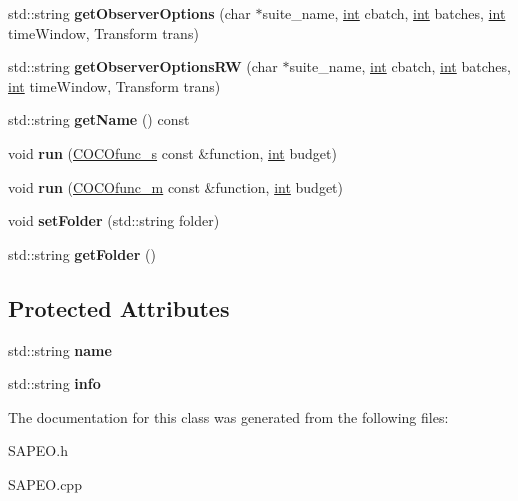 \begin{DoxyCompactItemize}
\item 
std\+::string {\bfseries get\+Observer\+Options} (char $\ast$suite\+\_\+name, \hyperlink{classint}{int} cbatch, \hyperlink{classint}{int} batches, \hyperlink{classint}{int} time\+Window, Transform trans)\hypertarget{classCocoOptimiser_ad9591d2b76f7078a956e7cdca1d8ba60}{}\label{classCocoOptimiser_ad9591d2b76f7078a956e7cdca1d8ba60}

\item 
std\+::string {\bfseries get\+Observer\+Options\+RW} (char $\ast$suite\+\_\+name, \hyperlink{classint}{int} cbatch, \hyperlink{classint}{int} batches, \hyperlink{classint}{int} time\+Window, Transform trans)\hypertarget{classCocoOptimiser_afc334f80b0aee491d2452f7f89402d17}{}\label{classCocoOptimiser_afc334f80b0aee491d2452f7f89402d17}

\item 
std\+::string {\bfseries get\+Name} () const \hypertarget{classCocoOptimiser_a265bd5d524ea5b10d5e9f4028cdc386c}{}\label{classCocoOptimiser_a265bd5d524ea5b10d5e9f4028cdc386c}

\item 
void {\bfseries run} (\hyperlink{classCOCOfunc__s}{C\+O\+C\+Ofunc\+\_\+s} const \&function, \hyperlink{classint}{int} budget)\hypertarget{classCocoOptimiser_a5842d02046cb097f0e11c84329f32799}{}\label{classCocoOptimiser_a5842d02046cb097f0e11c84329f32799}

\item 
void {\bfseries run} (\hyperlink{classCOCOfunc__m}{C\+O\+C\+Ofunc\+\_\+m} const \&function, \hyperlink{classint}{int} budget)\hypertarget{classCocoOptimiser_a1ad475649fa2f85129a8db7457cffeab}{}\label{classCocoOptimiser_a1ad475649fa2f85129a8db7457cffeab}

\item 
void {\bfseries set\+Folder} (std\+::string folder)\hypertarget{classCocoOptimiser_a2bfb5ff0b5420e95c6736070d4853eea}{}\label{classCocoOptimiser_a2bfb5ff0b5420e95c6736070d4853eea}

\item 
std\+::string {\bfseries get\+Folder} ()\hypertarget{classCocoOptimiser_aedb7b8bd6951c363b3ecbeb878cd0539}{}\label{classCocoOptimiser_aedb7b8bd6951c363b3ecbeb878cd0539}

\end{DoxyCompactItemize}
\subsection*{Protected Attributes}
\begin{DoxyCompactItemize}
\item 
std\+::string {\bfseries name}\hypertarget{classCocoOptimiser_a6832a1c556a6af0f47b0e1de31fc7488}{}\label{classCocoOptimiser_a6832a1c556a6af0f47b0e1de31fc7488}

\item 
std\+::string {\bfseries info}\hypertarget{classCocoOptimiser_a01d71a1cc52374efb3d9e0b4c80e44e7}{}\label{classCocoOptimiser_a01d71a1cc52374efb3d9e0b4c80e44e7}

\end{DoxyCompactItemize}


The documentation for this class was generated from the following files\+:\begin{DoxyCompactItemize}
\item 
S\+A\+P\+E\+O.\+h\item 
S\+A\+P\+E\+O.\+cpp\end{DoxyCompactItemize}
